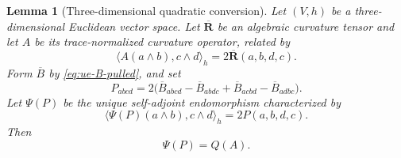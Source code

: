 \documentclass[10pt]{coll-l}
\newtheorem{lemma}[theorem]{Lemma}
\theoremstyle{definition}
\theoremstyle{remark}
\numberwithin{section}{chapter}
\numberwithin{equation}{chapter}
\begin{document}
\begin{lemma}[Three-dimensional quadratic conversion]
\label{lem:ue-three-dimensional-reaction}
Let $(V,h)$ be a three-dimensional Euclidean vector space.  Let
$\overline{\mathbf R}$ be an algebraic curvature tensor and let $A$ be its
trace-normalized curvature operator, related by
\[
 \langle A(a\wedge b),c\wedge d\rangle_h
       =2\overline{\mathbf R}(a,b,d,c).
\]
Form $\overline B$ by \eqref{eq:ue-B-pulled}, and set
\begin{equation}
 P_{abcd}
   =2\bigl(
       \overline B_{abcd}-\overline B_{abdc}
       +\overline B_{acbd}-\overline B_{adbc}
     \bigr).                                             \label{eq:ue-P-quadratic-tensor}
\end{equation}
Let $\Psi(P)$ be the unique self-adjoint endomorphism characterized by
\begin{equation}
 \langle\Psi(P)(a\wedge b),c\wedge d\rangle_h
       =2P(a,b,d,c).                                     \label{eq:ue-P-operator-bridge}
\end{equation}
Then
\begin{equation}
                            \Psi(P)=Q(A).                \label{eq:ue-reaction-conversion}
\end{equation}
\end{lemma}
\end{document}
